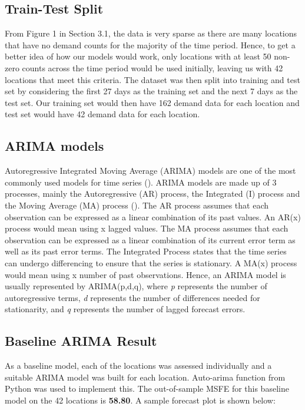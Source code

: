 \documentclass[10pt, letterpaper] {article}
\begin{document}
\subsection{Train-Test Split}
From Figure 1 in Section 3.1, the data is very sparse as there are many locations that have no demand counts for the majority of the time period. Hence, to get a better idea of how our models would work, only locations with at least 50 non-zero counts across the time period would be used initially, leaving us with 42 locations that meet this criteria. The dataset was then split into training and test set by considering the first 27 days as the training set and the next 7 days as the test set. Our training set would then have 162 demand data for each location and test set would have 42 demand data for each location. 

\subsection{ARIMA models}
Autoregressive Integrated Moving Average (ARIMA) models are one of the most commonly used models for time series (\cite{Asha2016}). ARIMA models are made up of 3 processes, mainly the Autoregressive (AR) process, the Integrated (I) process and the Moving Average (MA) process (\cite{Jamal2018}). The AR process assumes that each observation can be expressed as a linear combination of its past values.  An AR(x) process would mean using x lagged values. The MA process assumes that each observation can be expressed as a linear combination of its current error term as well as its past error terms. The Integrated Process states that the time series can undergo differencing to ensure that the series is stationary. A MA(x) process would mean using x number of past observations. Hence, an ARIMA model is usually represented by ARIMA(p,d,q), where \textit{p} represents the number of autoregressive terms, \textit{d} represents the number of differences needed for stationarity, and \textit{q} represents the number of lagged forecast errors. 

\subsection{Baseline ARIMA Result}
As a baseline model, each of the locations was assessed individually and a suitable ARIMA model was built for each location. Auto-arima function from Python was used to implement this. The out-of-sample MSFE for this baseline model on the 42 locations is \textbf{58.80}. A sample forecast plot is shown below:
\end{document}
